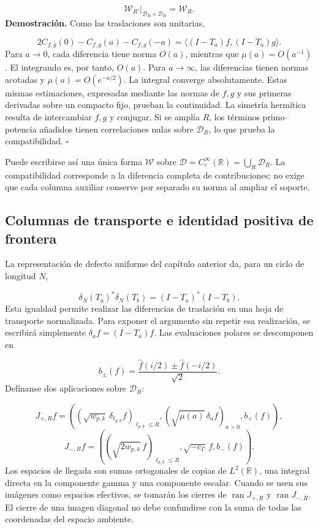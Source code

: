 \[
\mathscr W_{R'}|_{\mathcal D_R\times\mathcal D_R}=\mathscr W_R.
\]
\textbf{Demostración.} Como las traslaciones son unitarias,

\[
2C_{f,g}(0)-C_{f,g}(a)-C_{f,g}(-a)
=\langle(I-T_a)f,(I-T_a)g\rangle.
\]
Para \(a\to0\), cada diferencia tiene norma \(O(a)\), mientras que \(\mu(a)=O(a^{-1})\). El integrando es, por tanto, \(O(a)\). Para \(a\to\infty\), las diferencias tienen normas acotadas y \(\mu(a)=O(e^{-a/2})\). La integral converge absolutamente. Estas mismas estimaciones, expresadas mediante las normas de \(f,g\) y sus primeras derivadas sobre un compacto fijo, prueban la continuidad. La simetría hermítica resulta de intercambiar \(f,g\) y conjugar. Si se amplía \(R\), los términos primo–potencia añadidos tienen correlaciones nulas sobre \(\mathcal D_R\), lo que prueba la compatibilidad. \hfill\(\square\)

Puede escribirse así una única forma \(\mathscr W\) sobre \(\mathcal D=C_c^\infty(\mathbb R)=\bigcup_R\mathcal D_R\). La compatibilidad corresponde a la diferencia completa de contribuciones; no exige que cada columna auxiliar conserve por separado su norma al ampliar el soporte.

\subsection{Columnas de transporte e identidad positiva de frontera}
La representación de defecto uniforme del capítulo anterior da, para un ciclo de longitud \(N\),

\[
\delta_N(T_a)^*\delta_N(T_b)=(I-T_a)^*(I-T_b).
\]
Esta igualdad permite realizar las diferencias de traslación en una hoja de transporte normalizada. Para exponer el argumento sin repetir esa realización, se escribirá simplemente \(\delta_af=(I-T_a)f\). Las evaluaciones polares se descomponen en

\[
b_\pm(f)=\frac{\widehat f(i/2)\pm\widehat f(-i/2)}{\sqrt2}.
\]
Defínanse dos aplicaciones sobre \(\mathcal D_R\):

\[
J_{+,R}f=
\left(
(\sqrt{w_{p,k}}\,\delta_{\ell_{p,k}}f)_{\ell_{p,k}\leq R},
(\sqrt{\mu(a)}\,\delta_af)_{a>0},
b_+(f)
\right),
\]
\[
J_{-,R}f=
\left(
(\sqrt{2w_{p,k}}\,f)_{\ell_{p,k}\leq R},
\sqrt{-c_\Gamma}\,f,
b_-(f)
\right).
\]
Los espacios de llegada son sumas ortogonales de copias de \(L^2(\mathbb R)\), una integral directa en la componente gamma y una componente escalar. Cuando se usen sus imágenes como espacios efectivos, se tomarán los cierres de \(\operatorname{ran}J_{+,R}\) y \(\operatorname{ran}J_{-,R}\). El cierre de una imagen diagonal no debe confundirse con la suma de todas las coordenadas del espacio ambiente.

